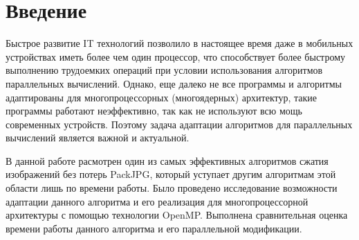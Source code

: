 \documentclass{matmex-diploma-custom}
\begin{document}
\maketitle
\tableofcontents
\newpage
\section*{Введение}

    Быстрое развитие IT технологий позволило в настоящее время даже в мобильных устройствах иметь более чем один процессор, что способствует более быстрому выполнению трудоемких операций при условии использования алгоритмов параллельных вычислений. Однако, еще далеко не все программы и алгоритмы адаптированы для многопроцессорных (многоядерных) архитектур, такие программы работают неэффективно, так как не используют всю мощь современных устройств. Поэтому задача адаптации алгоритмов для параллельных вычислений является важной и актуальной.

 В данной работе расмотрен один из самых эффективных алгоритмов сжатия изображений без потерь PackJPG, который уступает другим алгоритмам этой области лишь по времени работы. Было проведено исследование возможности адаптации данного алгоритма и его реализация для многопроцессорной архитектуры с помощью технологии OpenMP. Выполнена сравнительная оценка времени работы данного алгоритма и его параллельной модификации.
\end{document}
